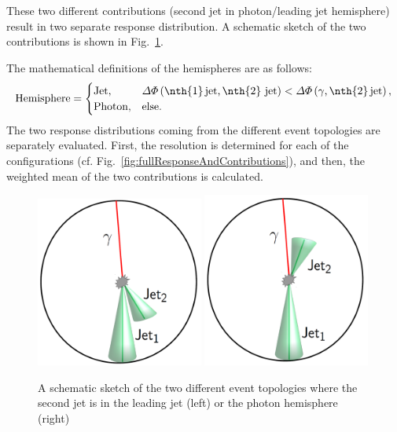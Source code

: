 These two different contributions (second jet in photon/leading jet hemisphere) result in two separate response distribution.
A schematic sketch of the two contributions is shown in Fig.~\ref{fig:sketch}. 



The mathematical definitions of the hemispheres are as follows:
\begin{equation}\label{eq:HemisphereDefinition}
\text{Hemisphere} = \begin{cases}
  \text{Jet},    & \Delta \Phi \left( \text{\nth{1}\,jet,\,\nth{2} jet} \right) < \Delta \Phi \left( \gamma \text{,\,\nth{2}\,jet} \right) , \\
  \text{Photon}, & \text{else}.\\
\end{cases}
\end{equation}
The two response distributions coming from the different event topologies are separately evaluated. First, the resolution is determined for each of the configurations 
(cf. Fig.~\ref{fig:fullResponseAndContributions}), and then, the weighted mean of the two contributions is calculated.
\begin{figure}[!t]
 \centering
     \includegraphics[width=0.49\textwidth]{figures/resolution/methodology/2ndJet_in_JetHemisphere.pdf}
     \includegraphics[width=0.49\textwidth]{figures/resolution/methodology/2ndJet_in_PhotonHemisphere.pdf}
  \caption{A schematic sketch of the two different event topologies where the second jet is in the leading jet (left) or the photon hemisphere (right)}  
 \label{fig:sketch}
\end{figure}
